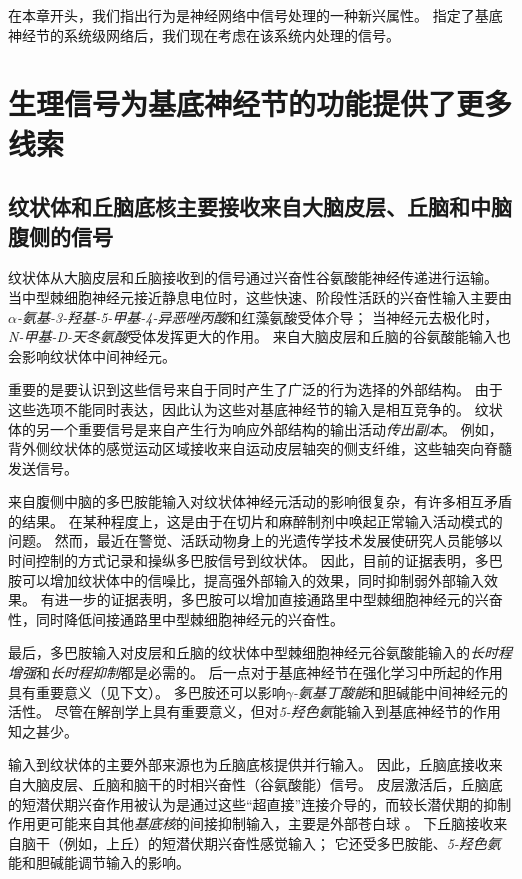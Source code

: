 在本章开头，我们指出行为是神经网络中信号处理的一种新兴属性。
指定了基底神经节的系统级网络后，我们现在考虑在该系统内处理的信号。



\section{生理信号为基底神经节的功能提供了更多线索}

\subsection{纹状体和丘脑底核主要接收来自大脑皮层、丘脑和中脑腹侧的信号}

纹状体从大脑皮层和丘脑接收到的信号通过兴奋性谷氨酸能神经传递进行运输。
当中型棘细胞神经元接近静息电位时，这些快速、阶段性活跃的兴奋性输入主要由\textit{$\alpha$-氨基-3-羟基-5-甲基-4-异恶唑丙酸}和红藻氨酸受体介导；
当神经元去极化时，\textit{N-甲基-D-天冬氨酸}受体发挥更大的作用。
来自大脑皮层和丘脑的谷氨酸能输入也会影响纹状体中间神经元。


重要的是要认识到这些信号来自于同时产生了广泛的行为选择的外部结构。
由于这些选项不能同时表达，因此认为这些对基底神经节的输入是相互竞争的。
纹状体的另一个重要信号是来自产生行为响应外部结构的输出活动\textit{传出副本}。
例如，背外侧纹状体的感觉运动区域接收来自运动皮层轴突的侧支纤维，这些轴突向脊髓发送信号。


来自腹侧中脑的多巴胺能输入对纹状体神经元活动的影响很复杂，有许多相互矛盾的结果。
在某种程度上，这是由于在切片和麻醉制剂中唤起正常输入活动模式的问题。
然而，最近在警觉、活跃动物身上的光遗传学技术发展使研究人员能够以时间控制的方式记录和操纵多巴胺信号到纹状体。
因此，目前的证据表明，多巴胺可以增加纹状体中的信噪比，提高强外部输入的效果，同时抑制弱外部输入效果。
有进一步的证据表明，多巴胺可以增加直接通路里中型棘细胞神经元的兴奋性，同时降低间接通路里中型棘细胞神经元的兴奋性。


最后，多巴胺输入对皮层和丘脑的纹状体中型棘细胞神经元谷氨酸能输入的\textit{长时程增强}和\textit{长时程抑制}都是必需的。
后一点对于基底神经节在强化学习中所起的作用具有重要意义（见下文）。
多巴胺还可以影响\textit{$\gamma$-氨基丁酸能}和胆碱能中间神经元的活性。
尽管在解剖学上具有重要意义，但对\textit{5-羟色氨}能输入到基底神经节的作用知之甚少。


输入到纹状体的主要外部来源也为丘脑底核提供并行输入。
因此，丘脑底接收来自大脑皮层、丘脑和脑干的时相兴奋性（谷氨酸能）信号。
皮层激活后，丘脑底的短潜伏期兴奋作用被认为是通过这些“超直接”连接介导的，而较长潜伏期的抑制作用更可能来自其他\textit{基底核}的间接抑制输入，主要是外部苍白球 。
下丘脑接收来自脑干（例如，上丘）的短潜伏期兴奋性感觉输入；
它还受多巴胺能、\textit{5-羟色氨}能和胆碱能调节输入的影响。



